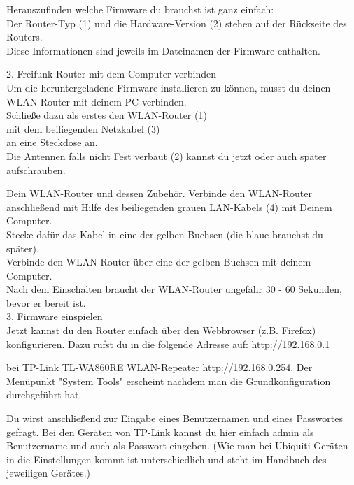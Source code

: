 \documentclass[11pt, a4paper,ngerman]{article}
\begin{document}
Herauszufinden welche Firmware du brauchst ist ganz einfach: \\
Der Router-Typ (1) und die Hardware-Version (2) stehen auf der Rückseite des Routers. \\
Diese Informationen sind jeweils im Dateinamen der Firmware enthalten.


{\Large 2. Freifunk-Router mit dem Computer verbinden} \\

Um die heruntergeladene Firmware installieren zu können, musst du deinen WLAN-Router mit deinem PC verbinden. \\
Schließe dazu als erstes den WLAN-Router (1) \\
mit dem beiliegenden Netzkabel (3) \\
an eine Steckdose an. \\

Die Antennen falls nicht Fest verbaut (2) kannst du jetzt oder auch später aufschrauben.




Dein WLAN-Router und dessen Zubehör.
Verbinde den WLAN-Router anschließend mit Hilfe des beiliegenden grauen LAN-Kabels (4) mit Deinem Computer. \\
Stecke dafür das Kabel in eine der gelben Buchsen (die blaue brauchst du später). \\






Verbinde den WLAN-Router über eine der gelben Buchsen mit deinem Computer. \\
Nach dem Einschalten braucht der WLAN-Router ungefähr 30 - 60 Sekunden, bevor er bereit ist. \\



{\Large 3. Firmware einspielen} \\

Jetzt kannst du den Router einfach über den Webbrowser (z.B. Firefox) konfigurieren. Dazu rufst du in die folgende Adresse auf: http://192.168.0.1

bei TP-Link TL-WA860RE WLAN-Repeater  http://192.168.0.254. Der Menüpunkt "System Tools" erscheint nachdem man die Grundkonfiguration durchgeführt hat.

Du wirst anschließend zur Eingabe eines Benutzernamen und eines Passwortes gefragt. Bei den Geräten von TP-Link kannst du hier einfach admin als Benutzername und auch als Passwort eingeben. (Wie man bei Ubiquiti Geräten in die Einstellungen kommt ist unterschiedlich und steht im Handbuch des jeweiligen Gerätes.)
\end{document}
